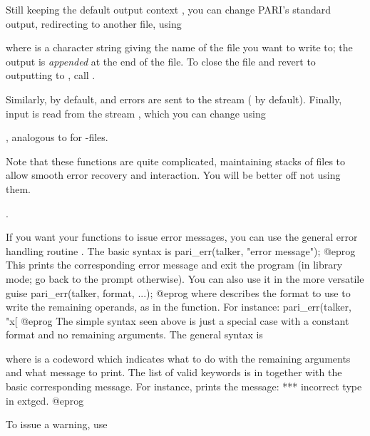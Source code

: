 Still keeping the default output context , you can change
PARI's standard output, redirecting  to another file, using

 where  is a character string
giving the name of the file you want to write to; the output is
\emph{appended} at the end of the file. To close the file and revert to
outputting to , call .

Similarly, by default,  and errors are sent to the
stream  ( by default). Finally, input is read
from the stream , which you can change using

, analogous to  for
-files.

Note that these functions are quite complicated, maintaining stacks of files
to allow smooth error recovery and  interaction. You will be better
off not using them.

.

\noindent
If you want your functions to issue error messages, you can use the general
error handling routine . The basic syntax is
%
\bprog
  pari_err(talker, "error message");
@eprog\noindent
This prints the corresponding error message and exit the program (in
library mode; go back to the  prompt otherwise).\label{se:err} You can
also use it in the more versatile guise
\bprog
  pari_err(talker, format, ...);
@eprog\noindent
where  describes the format to use to write the remaining
operands, as in the  function. For instance:
\bprog
  pari_err(talker, "x[%
@eprog\noindent
The simple syntax seen above is
just a special case with a constant format and no remaining arguments.
The general syntax is


\noindent where  is a codeword which indicates what to do with
the remaining arguments and what message to print. The list of valid keywords
is in  together with the basic corresponding
message. For instance,  prints the message:
\bprog
    ***   incorrect type in extgcd.
@eprog


\noindent To issue a warning, use

